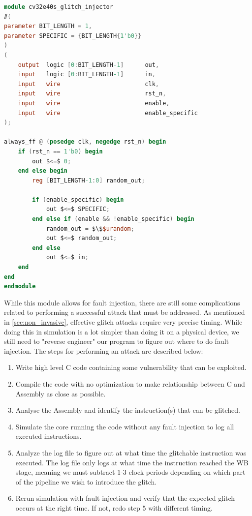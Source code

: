 \begin{lstlisting}[caption={SystemVerilog code for the glitch\_injector module}, label=lst:glitch_injector, language=verilog]
module cv32e40s_glitch_injector 
#(
parameter BIT_LENGTH = 1, 
parameter SPECIFIC = {BIT_LENGTH{1'b0}}
)
(
    output  logic [0:BIT_LENGTH-1]      out,
    input   logic [0:BIT_LENGTH-1]      in,
    input   wire                        clk,
    input   wire                        rst_n,
    input   wire                        enable,
    input   wire                        enable_specific    
);

always_ff @ (posedge clk, negedge rst_n) begin 
    if (rst_n == 1'b0) begin 
        out $<=$ 0;
    end else begin
        reg [BIT_LENGTH-1:0] random_out; 

        if (enable_specific) begin
            out $<=$ SPECIFIC;
        end else if (enable && !enable_specific) begin
            random_out = $\$$urandom;
            out $<=$ random_out; 
        end else
            out $<=$ in;  
    end
end
endmodule
\end{lstlisting}

While this module allows for fault injection, there are still some complications related to performing a successful attack that must be addressed. As mentioned in \autoref{sec:non_invasive}, effective glitch attacks require very precise timing. While doing this in simulation is a lot simpler than doing it on a physical device, we still need to "reverse engineer" our program to figure out where to do fault injection. The steps for performing an attack are described below:

\begin{enumerate}
    \item Write high level C code containing some vulnerability that can be exploited. 
    \item Compile the code with no optimization to make relationship between C and Assembly as close as possible.
    \item Analyse the Assembly and identify the instruction(s) that can be glitched.
    \item Simulate the core running the code without any fault injection to log all executed instructions. 
    \item Analyze the log file to figure out at what time the glitchable instruction was executed. The log file only logs at what time the instruction reached the WB stage, meaning we must subtract 1-3 clock periods depending on which part of the pipeline we wish to introduce the glitch. 
    \item Rerun simulation with fault injection and verify that the expected glitch occurs at the right time. If not, redo step 5 with different timing. 
\end{enumerate}

